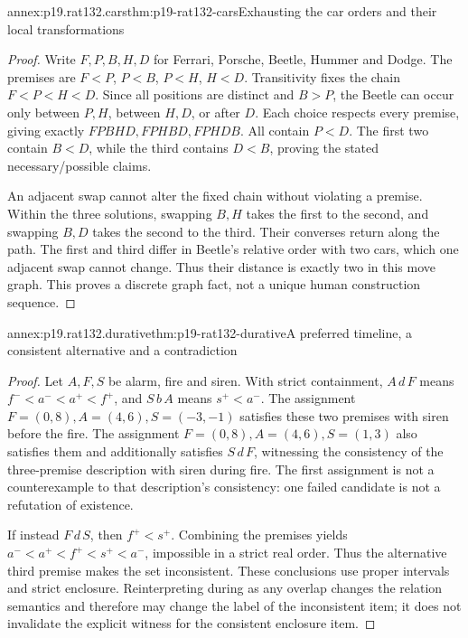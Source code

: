 \begin{annexitem}{annex:p19.rat132.cars}{thm:p19-rat132-cars}{Exhausting the car orders and their local transformations}
\begin{proof}
Write \(F,P,B,H,D\) for Ferrari, Porsche, Beetle, Hummer and Dodge.
The premises are \(F<P\), \(P<B\), \(P<H\), \(H<D\).
Transitivity fixes the chain \(F<P<H<D\). Since all positions are
distinct and \(B>P\), the Beetle can occur only between \(P,H\),
between \(H,D\), or after \(D\). Each choice respects every premise,
giving exactly \(FPBHD,FPHBD,FPHDB\).
All contain \(P<D\). The first two contain \(B<D\), while the
third contains \(D<B\), proving the stated necessary/possible claims.

An adjacent swap cannot alter the fixed chain without violating a premise.
Within the three solutions, swapping \(B,H\) takes the first to the
second, and swapping \(B,D\) takes the second to the third. Their
converses return along the path. The first and third differ in Beetle's
relative order with two cars, which one adjacent swap cannot change.
Thus their distance is exactly two in this move graph. This proves a
discrete graph fact, not a unique human construction sequence.
\end{proof}
\end{annexitem}

\begin{annexitem}{annex:p19.rat132.durative}{thm:p19-rat132-durative}{A preferred timeline, a consistent alternative and a contradiction}
\begin{proof}
Let \(A,F,S\) be alarm, fire and siren. With strict containment,
\(A\,d\,F\) means
\(f^-<a^-<a^+<f^+\), and \(S\,b\,A\) means
\(s^+<a^-\). The assignment
\(F=(0,8), A=(4,6), S=(-3,-1)\) satisfies these two premises
with siren before the fire. The assignment
\(F=(0,8), A=(4,6), S=(1,3)\) also satisfies them and additionally
satisfies \(S\,d\,F\), witnessing the consistency of the
three-premise description with siren during fire. The first assignment
is not a counterexample to that description's consistency: one failed
candidate is not a refutation of existence.

If instead \(F\,d\,S\), then \(f^+<s^+\). Combining the
premises yields
\(a^-<a^+<f^+<s^+<a^-\), impossible in a strict real order.
Thus the alternative third premise makes the set inconsistent.
These conclusions use proper intervals and strict enclosure. Reinterpreting
during as any overlap changes the relation semantics and therefore may
change the label of the inconsistent item; it does not invalidate the
explicit witness for the consistent enclosure item.
\end{proof}
\end{annexitem}

